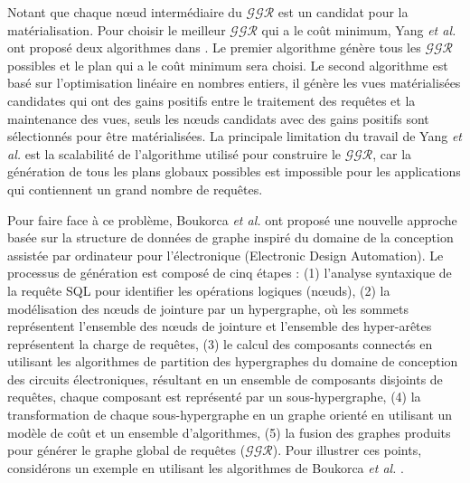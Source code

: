 Notant que chaque nœud intermédiaire du $\mathcal{GGR}$ est un candidat pour la matérialisation.
Pour choisir le meilleur $\mathcal{GGR}$ qui a le coût minimum, Yang \textit{et al.} ont proposé deux algorithmes dans \cite{Yang97}. Le premier algorithme génère tous les $\mathcal{GGR}$ possibles et le plan qui a le coût minimum sera choisi. Le second algorithme est basé sur l'optimisation linéaire en nombres entiers, il génère les vues matérialisées candidates qui ont des gains positifs entre le traitement des requêtes et la maintenance des vues, seuls les nœuds candidats avec des gains positifs sont sélectionnés pour être matérialisées. La principale limitation du travail de Yang \textit{et al.} est la scalabilité de l'algorithme utilisé pour construire le $\mathcal{GGR}$, car la génération de tous les plans globaux possibles est impossible pour les applications qui contiennent un grand nombre de requêtes.

Pour faire face à ce problème, Boukorca \textit{et al.} \cite{Boukorca15} ont proposé une nouvelle approche basée sur la structure de données de graphe inspiré du domaine de la conception assistée par ordinateur pour l'électronique (Electronic Design Automation). Le processus de génération est composé de cinq étapes : (1) l'analyse syntaxique de la requête SQL pour identifier les opérations logiques (nœuds), (2) la modélisation des nœuds de jointure par un hypergraphe, où les sommets représentent l'ensemble des nœuds de jointure et l'ensemble des hyper-arêtes représentent la charge de requêtes, (3) le calcul des composants connectés en utilisant les algorithmes de partition des hypergraphes du domaine de conception des circuits électroniques, résultant en un ensemble de composants disjoints de requêtes, chaque composant est représenté par un sous-hypergraphe, (4) la transformation de chaque sous-hypergraphe en un graphe orienté en utilisant un modèle de coût et un ensemble d'algorithmes, (5) la fusion des graphes produits pour générer le graphe global de requêtes ($\mathcal{GGR}$). Pour illustrer ces points, considérons un exemple en utilisant les algorithmes de Boukorca \textit {et al.} \cite{Boukorca15}.

